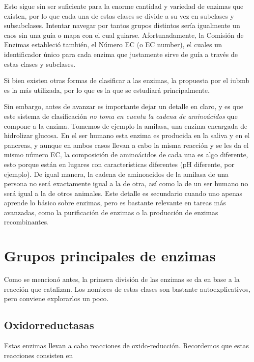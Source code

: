 Esto sigue sin ser suficiente para la enorme cantidad y variedad de enzimas que existen, por lo que cada una de estas clases se divide a su vez en subclases y subsubclases. Intentar navegar por tantos grupos distintos sería igualmente un caos sin una guía o mapa con el cual guiarse. Afortunadamente, la Comisión de Enzimas estableció también, el Número EC (o EC number), el cuales un identificador único para cada enzima que justamente sirve de guía a través de estas clases y subclases.

Si bien existen otras formas de clasificar a las enzimas, la propuesta por el \acrshort{iubmb} es la más utilizada, por lo que es la que se estudiará principalmente. 

Sin embargo, antes de avanzar es importante dejar un detalle en claro, y es que este sistema de clasificación \emph{no toma en cuenta la cadena de aminoácidos} que compone a la enzima. Tomemos de ejemplo la amilasa, una enzima encargada de hidrolizar glucosa. En el ser humano esta enzima es producida en la saliva y en el pancreas, y aunque en ambos casos llevan a cabo la misma reacción y se les da el mismo número EC, la composición de aminoácidos de cada una es algo diferente, esto porque están en lugares con características diferentes (pH diferente, por ejemplo). De igual manera, la cadena de aminoacidos de la amilasa de una persona no será exactamente igual a la de otra, así como la de un ser humano no será igual a la de otros animales. Este detalle es secundario cuando uno apenas aprende lo básico sobre enzimas, pero es bastante relevante en tareas más avanzadas, como la purificación de enzimas o la producción de enzimas recombinantes.



\section{Grupos principales de enzimas}\label{sec:clases_de_enzimas}

Como se mencionó antes, la primera división de las enzimas se da en base a la reacción que catalizan. Los nombres de estas clases son bastante autoexplicativos, pero conviene explorarlos un poco.

\subsection{Oxidorreductasas}

Estas enzimas llevan a cabo reacciones de oxido-reducción. Recordemos que estas reacciones consisten en 

